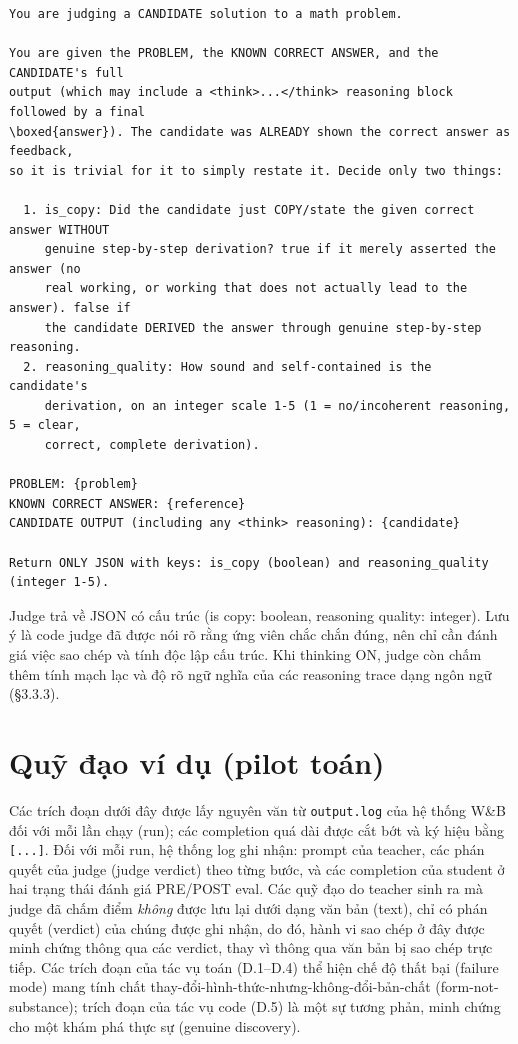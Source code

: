 \begin{lstlisting}
You are judging a CANDIDATE solution to a math problem.

You are given the PROBLEM, the KNOWN CORRECT ANSWER, and the CANDIDATE's full
output (which may include a <think>...</think> reasoning block followed by a final
\boxed{answer}). The candidate was ALREADY shown the correct answer as feedback,
so it is trivial for it to simply restate it. Decide only two things:

  1. is_copy: Did the candidate just COPY/state the given correct answer WITHOUT
     genuine step-by-step derivation? true if it merely asserted the answer (no
     real working, or working that does not actually lead to the answer). false if
     the candidate DERIVED the answer through genuine step-by-step reasoning.
  2. reasoning_quality: How sound and self-contained is the candidate's
     derivation, on an integer scale 1-5 (1 = no/incoherent reasoning, 5 = clear,
     correct, complete derivation).

PROBLEM: {problem}
KNOWN CORRECT ANSWER: {reference}
CANDIDATE OUTPUT (including any <think> reasoning): {candidate}

Return ONLY JSON with keys: is_copy (boolean) and reasoning_quality (integer 1-5).
\end{lstlisting}

Judge trả về JSON có cấu trúc (is copy: boolean, reasoning quality: integer). Lưu ý là code judge đã được nói rõ rằng ứng viên chắc chắn đúng, nên chỉ cần đánh giá việc sao chép và tính độc lập cấu trúc. Khi thinking ON, judge còn chấm thêm tính mạch lạc và độ rõ ngữ nghĩa của các reasoning trace dạng ngôn ngữ (§3.3.3).

\chapter{Quỹ đạo ví dụ (pilot toán)}\label{appendix-d-example-trajectories-math-pilot}

Các trích đoạn dưới đây được lấy nguyên văn từ \passthrough{\lstinline!output.log!} của hệ thống W\&B đối với mỗi lần chạy (run); các completion quá dài được cắt bớt và ký hiệu bằng \passthrough{\lstinline![...]!}. Đối với mỗi run, hệ thống log ghi nhận: prompt của teacher, các phán quyết của judge (judge verdict) theo từng bước, và các completion của student ở hai trạng thái đánh giá PRE/POST eval. Các quỹ đạo do teacher sinh ra mà judge đã chấm điểm \emph{không} được lưu lại dưới dạng văn bản (text), chỉ có phán quyết (verdict) của chúng được ghi nhận, do đó, hành vi sao chép ở đây được minh chứng thông qua các verdict, thay vì thông qua văn bản bị sao chép trực tiếp. Các trích đoạn của tác vụ toán (D.1--D.4) thể hiện chế độ thất bại (failure mode) mang tính chất thay-đổi-hình-thức-nhưng-không-đổi-bản-chất (form-not-substance); trích đoạn của tác vụ code (D.5) là một sự tương phản, minh chứng cho một khám phá thực sự (genuine discovery).

